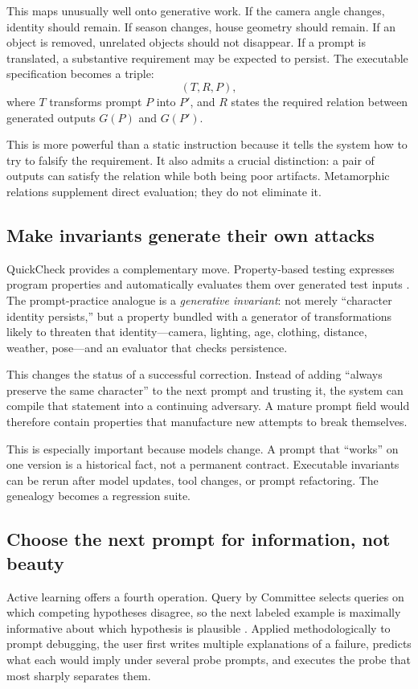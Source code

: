 \documentclass[11pt]{article}
\begin{document}
This maps unusually well onto generative work. If the camera angle changes, identity should remain. If season changes, house geometry should remain. If an object is removed, unrelated objects should not disappear. If a prompt is translated, a substantive requirement may be expected to persist. The executable specification becomes a triple:
\[
(T,R,P),
\]
where $T$ transforms prompt $P$ into $P'$, and $R$ states the required relation between generated outputs $G(P)$ and $G(P')$.

This is more powerful than a static instruction because it tells the system how to try to falsify the requirement. It also admits a crucial distinction: a pair of outputs can satisfy the relation while both being poor artifacts. Metamorphic relations supplement direct evaluation; they do not eliminate it.

\subsection{Make invariants generate their own attacks}

QuickCheck provides a complementary move. Property-based testing expresses program properties and automatically evaluates them over generated test inputs \cite{claessen2000quickcheck}. The prompt-practice analogue is a \emph{generative invariant}: not merely ``character identity persists,'' but a property bundled with a generator of transformations likely to threaten that identity---camera, lighting, age, clothing, distance, weather, pose---and an evaluator that checks persistence.

This changes the status of a successful correction. Instead of adding ``always preserve the same character'' to the next prompt and trusting it, the system can compile that statement into a continuing adversary. A mature prompt field would therefore contain properties that manufacture new attempts to break themselves.

This is especially important because models change. A prompt that ``works'' on one version is a historical fact, not a permanent contract. Executable invariants can be rerun after model updates, tool changes, or prompt refactoring. The genealogy becomes a regression suite.

\subsection{Choose the next prompt for information, not beauty}

Active learning offers a fourth operation. Query by Committee selects queries on which competing hypotheses disagree, so the next labeled example is maximally informative about which hypothesis is plausible \cite{seung1992query}. Applied methodologically to prompt debugging, the user first writes multiple explanations of a failure, predicts what each would imply under several probe prompts, and executes the probe that most sharply separates them.
\end{document}

